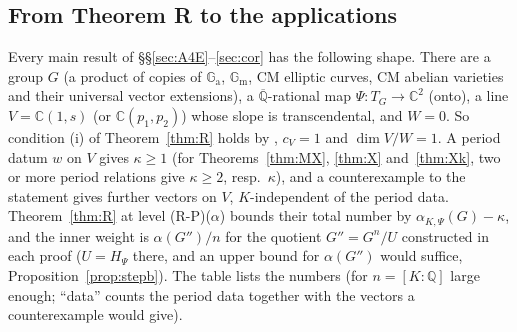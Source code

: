 \documentclass[11pt]{amsart}
\theoremstyle{definition}
\newcommand{\Qb}{\overline{\mathbb{Q}}}
\newcommand{\C}{\mathbb{C}}
\newcommand{\Q}{\mathbb{Q}}
\newcommand{\Ga}{\mathbb{G}_{\mathrm a}}
\newcommand{\Gm}{\mathbb{G}_{\mathrm m}}
\begin{document}
\subsection{From Theorem R to the applications}\label{sec:RtoApp}
Every main result of \S\S\ref{sec:A4E}--\ref{sec:cor} has the following shape. There are a group $G$ (a product of copies of
$\Ga$, $\Gm$, CM elliptic curves, CM abelian varieties and their universal vector extensions), a $\Qb$-rational map
$\Psi\colon T_G\to\C^2$ (onto), a line $V=\C(1,s)$ (or $\C(p_1,p_2)$) whose slope is transcendental, and $W=0$. So
condition (i) of Theorem~\ref{thm:R} holds by \cite[Remarque 1]{RW93}, $c_V=1$ and $\dim V/W=1$. A period datum $w$ on $V$
gives $\kappa\ge1$ (for Theorems~\ref{thm:MX}, \ref{thm:X} and~\ref{thm:Xk}, two or more period relations give
$\kappa\ge2$, resp.\ $\kappa$), and a counterexample to the statement gives further vectors on $V$, $K$-independent of the
period data. Theorem~\ref{thm:R} at level (R-P)($\alpha$) bounds their total number by $\alpha_{K,\Psi}(G)-\kappa$, and the
inner weight is $\alpha(G'')/n$ for the quotient $G''=G^n/U$ constructed in each proof ($U=H_\Psi$ there, and an upper
bound for $\alpha(G'')$ would suffice, Proposition~\ref{prop:stepb}). The table lists the numbers (for $n=[K:\Q]$ large
enough; ``data'' counts the period data together with the vectors a counterexample would give).
\end{document}

